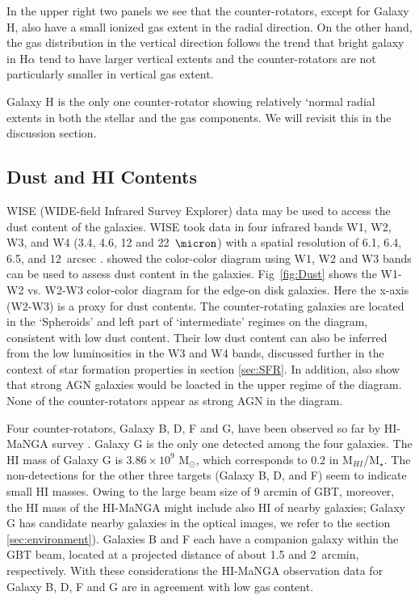 \documentclass[fleqn,usenatbib]{mnras}
\begin{document}
In the upper right two panels we see that 
the counter-rotators, except for Galaxy H, also
have a small ionized gas extent in the radial direction.
On the other hand, the gas distribution in the vertical direction  
follows the trend that bright galaxy in H$\alpha$ tend to have larger vertical extents and the counter-rotators are not particularly smaller in vertical gas extent.

Galaxy H is the only one counter-rotator showing 
relatively `normal radial extents in both the stellar and the gas components.
We will revisit this in the discussion section. 


\subsection{Dust and HI Contents} \label{sec:Dust}

WISE (WIDE-field Infrared Survey Explorer) data may be used to access 
the dust content of the galaxies. 
WISE took data in four infrared bands W1, W2, W3, and W4 
(3.4, 4.6, 12 and 22~$\micron$)
with a spatial resolution of 6.1, 6.4, 6.5, and 12~arcsec \citep{WISE}.
\citet{Jarrett2011,Jarrett2017} showed the color-color diagram using 
W1, W2 and W3 bands can be used to assess dust content in the galaxies.
Fig~\ref{fig:Dust} shows the W1-W2 vs. W2-W3 color-color diagram
for the edge-on disk galaxies. 
Here the x-axis (W2-W3) is a proxy for dust contents. 
The counter-rotating galaxies are located in the
`Spheroids' and left part of `intermediate' regimes on the diagram, 
consistent with low dust content. 
Their low dust content can also be inferred from the 
low luminosities in the W3 and W4 bands, 
discussed further in the context of star formation properties 
in section \ref{sec:SFR}. 
In addition, \citet{Jarrett2011,Jarrett2017} also show that 
strong AGN galaxies would be loacted in the upper regime of the diagram. 
None of the counter-rotators appear as strong AGN in the diagram.

Four counter-rotators, Galaxy B, D, F and G,
have been observed so far by HI-MaNGA survey
\citep{Haynes2018,Masters2019,Goddy2020,Stark2021}. 
Galaxy G is the only one detected among the four galaxies.
The HI mass of Galaxy G is $3.86\times10^{9}$ M$_{\odot}$, which 
corresponds to 0.2 in M$_{HI}$/M$_{\star}$.
The non-detections for the other three targets (Galaxy B, D, and F)
seem to indicate small HI masses.
Owing to the large beam size of 9 arcmin of GBT, moreover,
the HI mass of the HI-MaNGA might include also HI of nearby galaxies;
Galaxy G has candidate nearby galaxies in the optical images,
we refer to the section \ref{sec:environment}).
Galaxies B and F each have a companion galaxy
within the GBT beam, located at a projected distance of 
about 1.5 and 2~arcmin, respectively.
With these considerations the HI-MaNGA observation data
for Galaxy B, D, F and G are in agreement with low gas content.
\end{document}
